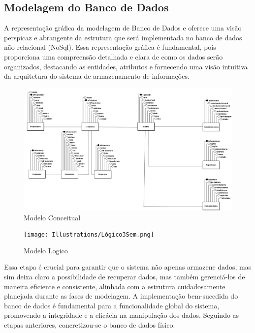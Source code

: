 \subsection*{Modelagem do Banco de Dados}

A representação gráfica da modelagem de Banco de Dados  e   oferece uma visão perspicaz e abrangente da estrutura que será implementada no banco de dados não relacional (NoSql). Essa representação gráfica é fundamental, pois proporciona uma compreensão detalhada e clara de como os dados serão organizados, destacando as entidades, atributos e fornecendo uma visão intuitiva da arquitetura do sistema de armazenamento de informações. 

\begin{figure}[!h]
\centering
\caption{Modelo Conceitual}%
\label{fig:banco1}
\includegraphics[scale=0.2]{Illustrations/Conceitual3Sem.png}
\end{figure}

\newpage

\begin{figure}[!h]
\centering
\caption{Modelo Logico}%
\label{fig:banco2}
\texttt{[image: Illustrations/Lógico3Sem.png]}
\end{figure}

Essa etapa é crucial para garantir que o sistema não apenas armazene dados, mas sim deixa claro a possibilidade de recuperar dados, mas também gerenciá-los de maneira eficiente e consistente, alinhada com a estrutura cuidadosamente planejada durante as fases de modelagem. A implementação bem-sucedida do banco de dados é fundamental para a funcionalidade global do sistema, promovendo a integridade e a eficácia na manipulação dos dados. Seguindo as etapas anteriores, concretizou-se o banco de dados físico.

